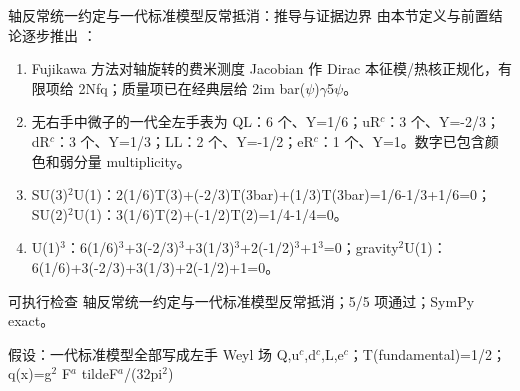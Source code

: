 \begin{frame}[t]{轴反常统一约定与一代标准模型反常抵消：推导与证据边界}
\footnotesize
{}\quad 由本节定义与前置结论逐步推出 ：
\begin{enumerate}
\item Fujikawa 方法对轴旋转的费米测度 Jacobian 作 Dirac 本征模/\allowbreak{}热核正规化，有限项给 2Nfq；质量项已在经典层给 2im bar(\ensuremath{\psi})\ensuremath{\gamma}5\ensuremath{\psi}。
\item 无右手中微子的一代全左手表为 QL：6 个、Y=1/\allowbreak{}6；uR\ensuremath{^{c}}：3 个、Y=-2/\allowbreak{}3；dR\ensuremath{^{c}}：3 个、Y=1/\allowbreak{}3；LL：2 个、Y=-1/\allowbreak{}2；eR\ensuremath{^{c}}：1 个、Y=1。数字已包含颜色和弱分量 multiplicity。
\item SU(3)\ensuremath{^{2}}U(1)：2(1/\allowbreak{}6)T(3)+(-2/\allowbreak{}3)T(3bar)+(1/\allowbreak{}3)T(3bar)=1/\allowbreak{}6-1/\allowbreak{}3+1/\allowbreak{}6=0；SU(2)\ensuremath{^{2}}U(1)：3(1/\allowbreak{}6)T(2)+(-1/\allowbreak{}2)T(2)=1/\allowbreak{}4-1/\allowbreak{}4=0。
\item U(1)\ensuremath{^{3}}：6(1/\allowbreak{}6)\ensuremath{^{3}}+3(-2/\allowbreak{}3)\ensuremath{^{3}}+3(1/\allowbreak{}3)\ensuremath{^{3}}+2(-1/\allowbreak{}2)\ensuremath{^{3}}+1\ensuremath{^{3}}=0；gravity\ensuremath{^{2}}U(1)：6(1/\allowbreak{}6)+3(-2/\allowbreak{}3)+3(1/\allowbreak{}3)+2(-1/\allowbreak{}2)+1=0。
\end{enumerate}\begin{block}{可执行检查}
\quad 轴反常统一约定与一代标准模型反常抵消；5/5 项通过；SymPy exact。
\par\scriptsize 假设：一代标准模型全部写成左手 Weyl 场 Q,u\ensuremath{^{c}},d\ensuremath{^{c}},L,e\ensuremath{^{c}}；T(fundamental)=1/\allowbreak{}2；q(x)=g\ensuremath{^{2}} F\ensuremath{^{a}} tildeF\ensuremath{^{a}}/\allowbreak{}(32pi\ensuremath{^{2}})
\end{block}
\end{frame}

